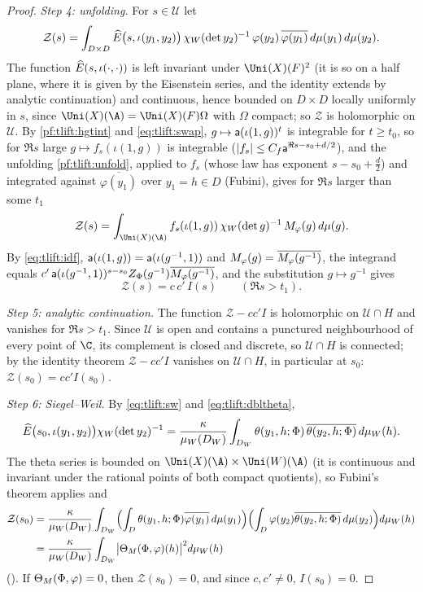 \begin{proof}
\emph{Step 4: unfolding.} For $s\in\mathcal U$ let
\[
  \mathcal Z(s)=\int_{D\times D}\widehat{E}\bigl(s,\iota(y_1,y_2)\bigr)\,\chi_W(\det y_2)^{-1}\,\varphi(y_2)\,\overline{\varphi(y_1)}\,d\mu(y_1)\,d\mu(y_2).
\]
The function $\widehat{E}(s,\iota(\cdot,\cdot))$ is left invariant under $\Uni(X)(F)^2$ (it is so on a half plane, where it is
given by the Eisenstein series, and the identity extends by analytic continuation) and continuous,
hence bounded on $D\times D$ locally uniformly in $s$, since $\Uni(X)(\A)=\Uni(X)(F)\Omega$ with $\Omega$ compact; so
$\mathcal Z$ is holomorphic on $\mathcal U$. By \cref{pf:tlift:hgtint} and \eqref{eq:tlift:swap}, $g\mapsto\mathsf{a}(\iota(1,g))^t$ is
integrable for $t\ge t_0$, so for $\Re s$ large $g\mapsto f_s(\iota(1,g))$ is integrable ($|f_s|\le C_f\mathsf{a}^{\Re s-s_0+d/2}$),
and the unfolding \cref{pf:tlift:unfold}, applied to $f_s$ (whose law has exponent $s-s_0+\frac d2$) and
integrated against $\overline{\varphi(y_1)}$ over $y_1=h\in D$ (Fubini), gives for $\Re s$ larger than some $t_1$
\[
  \mathcal Z(s)=\int_{\Uni(X)(\A)}f_s(\iota(1,g))\,\chi_W(\det g)^{-1}\,\tliftM_\varphi(g)\,d\mu(g).
\]
By \eqref{eq:tlift:idf}, $\mathsf{a}(\iota(1,g))=\mathsf{a}(\iota(g^{-1},1))$ and $M_\varphi(g)=\overline{M_\varphi(g^{-1})}$, the
integrand equals $c'\,\mathsf{a}(\iota(g^{-1},1))^{s-s_0}Z_\Phi(g^{-1})\overline{M_\varphi(g^{-1})}$, and the substitution
$g\mapsto g^{-1}$ gives
\begin{equation}\label{eq:tlift:zeta}
  \mathcal Z(s)=c\,c'\,I(s)\qquad(\Re s>t_1).
\end{equation}

\emph{Step 5: analytic continuation.} The function $\mathcal Z-cc'I$ is holomorphic on $\mathcal U\cap H$ and vanishes
for $\Re s>t_1$. Since $\mathcal U$ is open and contains a punctured neighbourhood of every point of $\C$, its
complement is closed and discrete, so $\mathcal U\cap H$ is connected; by the identity theorem
$\mathcal Z-cc'I$ vanishes on $\mathcal U\cap H$, in particular at $s_0$:
$\mathcal Z(s_0)=cc'I(s_0)$.

\emph{Step 6: Siegel--Weil.} By \eqref{eq:tlift:sw} and \eqref{eq:tlift:dbltheta},
\[
  \widehat{E}\bigl(s_0,\iota(y_1,y_2)\bigr)\chi_W(\det y_2)^{-1}
  =\frac{\kappa}{\mu_W(D_W)}\int_{D_W}\theta(y_1,h;\Phi)\,\overline{\theta(y_2,h;\Phi)}\,d\mu_W(h).
\]
The theta series is bounded on $\Uni(X)(\A)\times\Uni(W)(\A)$ (it is continuous and invariant under the rational
points of both compact quotients), so Fubini's theorem applies and
\begin{align*}
  \mathcal Z(s_0)&=\frac{\kappa}{\mu_W(D_W)}\int_{D_W}\Bigl(\int_D\theta(y_1,h;\Phi)\overline{\varphi(y_1)}\,d\mu(y_1)\Bigr)
  \Bigl(\int_D\varphi(y_2)\overline{\theta(y_2,h;\Phi)}\,d\mu(y_2)\Bigr)d\mu_W(h)\\
  &=\frac{\kappa}{\mu_W(D_W)}\int_{D_W}\bigl|\Theta_M(\Phi,\varphi)(h)\bigr|^2d\mu_W(h)
\end{align*}
(). If $\Theta_M(\Phi,\varphi)=0$, then $\mathcal Z(s_0)=0$, and since $c,c'\ne0$,
$I(s_0)=0$.
\end{proof}


